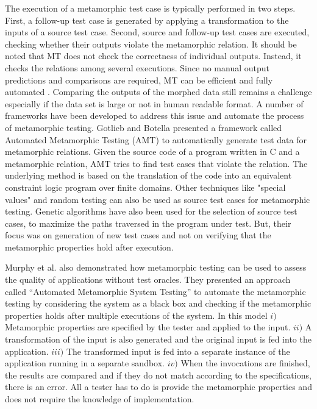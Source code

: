 The execution of a metamorphic test case is typically performed in two steps. First, a follow-up test case is generated by applying a transformation to the inputs of a source test case. Second, source and follow-up test cases are executed, checking whether their outputs violate the metamorphic relation. It should be noted that MT does not check the correctness of individual outputs. Instead, it checks the relations among several executions. Since no manual output predictions and comparisons are required, MT can be efficient and fully automated \cite{Segura2016}. Comparing the outputs of the morphed data still remains a challenge especially if the data set is large or not in human readable format.
A number of frameworks have been developed to address this issue and automate the process of metamorphic testing. Gotlieb and Botella \cite{Gotlieb2003} presented a framework called Automated Metamorphic Testing (AMT) to automatically generate test data for metamorphic relations. Given the source code of a program written in C and a metamorphic relation, AMT tries to find test cases that violate the relation. The underlying method is based on the translation of the code into an equivalent constraint logic program over finite domains. Other techniques like "special values"  and random testing can also be used as source test cases for metamorphic testing. Genetic algorithms have also been used for the selection of source test cases, to maximize the paths traversed in the program under test. But, their focus was on generation of new test cases and not on verifying that the metamorphic properties hold after execution.
	
Murphy et al. \cite{Murphy2009} also demonstrated how metamorphic testing can be used to assess the quality of applications without test oracles.  They presented an approach called ``Automated Metamorphic System Testing'' to automate the metamorphic testing by considering the system as a black box and checking if the metamorphic properties holds after multiple executions of the system. In this model $i)$ Metamorphic properties are specified by the tester and applied to the input. $ii)$ A transformation of the input is also generated and the original input is fed into the application. $iii)$ The transformed input is fed into a separate instance of the application running in a separate sandbox. $iv)$ When the invocations are finished, the results are compared and if they do not match according to the specifications, there is an error. All a tester has to do is provide the metamorphic properties and does not require the knowledge of implementation.

